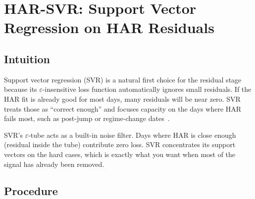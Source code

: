 \section{HAR-SVR: Support Vector Regression on HAR Residuals}
\label{sec:hybrid:har-svr}

\subsection{Intuition}

Support vector regression (SVR) is a natural first choice for the residual
stage because its $\varepsilon$-insensitive loss function automatically
ignores small residuals.  If the HAR fit is already good for most days,
many residuals will be near zero.  SVR treats those as ``correct enough''
and focuses capacity on the days where HAR fails most, such as
post-jump or regime-change dates~\citep{RahimikiaPoon2020}.

\begin{intuition}
SVR's $\varepsilon$-tube acts as a built-in noise filter.  Days where HAR
is close enough (residual inside the tube) contribute zero loss.  SVR
concentrates its support vectors on the hard cases, which is exactly what
you want when most of the signal has already been removed.
\end{intuition}

\subsection{Procedure}

